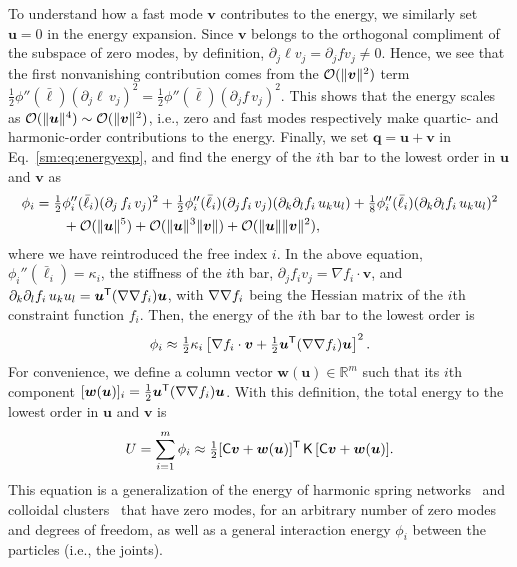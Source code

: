 To understand how a fast mode $\bm{v}$ contributes to the energy, we similarly set $\bm{u} = 0$ in the energy expansion.
Since $\bm{v}$ belongs to the orthogonal compliment of the subspace of zero modes, by definition, $\partial_j \ell v_j = \partial_j f v_j \ne 0$.
Hence, we see that the first nonvanishing contribution comes from the $\mathcal{O}(\lVert\bm{v}\rVert^2)$ term $\tfrac{1}{2}\phi''(\bar{\ell})(\partial_j \ell\, v_j)^2 = \tfrac{1}{2}\phi''(\bar{\ell})(\partial_j f\, v_j)^2$.
This shows that the energy scales as $\mathcal{O}(\lVert\bm{u}\rVert^4) \sim \mathcal{O}(\lVert\bm{v}\rVert^2)$, i.e., zero and fast modes respectively make quartic- and harmonic-order contributions to the energy.
Finally, we set $\bm{q} = \bm{u} + \bm{v}$ in Eq.~\eqref{sm:eq:energyexp}, and find the energy of the $i$th bar to the lowest order in $\bm{u}$ and $\bm{v}$ as
%
\begin{equation}
  \begin{aligned}
    \phi_i &= \tfrac{1}{2}\phi_i''(\bar{\ell}_i)(\partial_j\, f_i\, v_j)^2 + \tfrac{1}{2}\phi''_i(\bar{\ell}_i)(\partial_j f_i\, v_j)(\partial_k \partial_l f_i\, u_k u_l) + \tfrac{1}{8}\phi''_i(\bar{\ell}_i)(\partial_k \partial_l f_i\, u_k u_l)^2\\
           &\qquad+ \mathcal{O}(\lVert\bm{u}\rVert^5) + \mathcal{O}(\lVert\bm{u}\rVert^{3}\lVert\bm{v}\rVert) +\mathcal{O}(\lVert\bm{u}\rVert\lVert\bm{v}\rVert^{2}),
  \end{aligned}
\end{equation}
%
where we have reintroduced the free index $i$.
In the above equation, $\phi_{i}''(\bar{\ell}_i) = \kappa_i$, the stiffness of the $i$th bar, $\partial_j f_i v_j = \nabla f_i\cdot\bm{v}$, and $\partial_k\partial_l f_i\, u_k u_l = \bm{u}^\mathsf{T}(\nabla\nabla f_i)\bm{u}$, with $\nabla\nabla f_i$ being the Hessian matrix of the $i$th constraint function $f_i$.
Then, the energy of the $i$th bar to the lowest order is
%
\begin{equation}
  \phi_i \approx \tfrac{1}{2}\kappa_i \left[\nabla f_i\cdot\bm{v} + \tfrac{1}{2}\bm{u}^\mathsf{T}(\nabla\nabla f_i)\bm{u}\right]^2.
\end{equation}
%
For convenience, we define a column vector $\bm{w}(\bm{u}) \in \mathbb{R}^{m}$ such that its $i$th component $[\bm{w}(\bm{u})]_{i} = \tfrac{1}{2}\bm{u}^\mathsf{T}(\nabla\nabla f_{i})\bm{u}$.
With this definition, the total energy to the lowest order in $\bm{u}$ and $\bm{v}$ is
%
\begin{equation}
  U = \sum_{i=1}^m \phi_i \approx \tfrac{1}{2} [\mathsf{C}\bm{v} + \bm{w}(\bm{u})]^\mathsf{T}\,\mathsf{K}\,[\mathsf{C}\bm{v} + \bm{w}(\bm{u})].
  \label{eq:energy_singular}
\end{equation}
%
This equation is a generalization of the energy of harmonic spring networks~\cite{zhang2016,woodhouse2018} and colloidal clusters~\cite{kallus2017} that have zero modes, for an arbitrary number of zero modes and degrees of freedom, as well as a general interaction energy $\phi_{i}$ between the particles (i.e., the joints).

